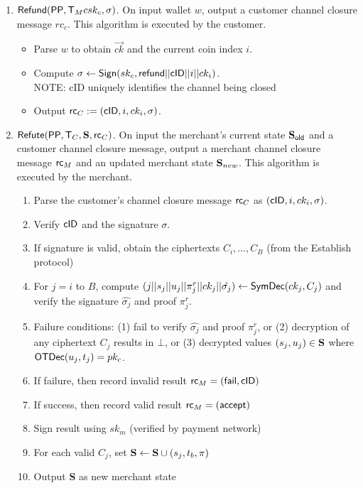 \documentclass[11pt]{report}
\begin{document}
\begin{enumerate}
\item ${\sf Refund}({\sf PP}, {\sf T}_{M} csk_c, \sigma)$. On input wallet $w$, output a customer channel closure message $rc_c$. This algorithm is executed by the customer.
\begin{itemize}
\item Parse $w$ to obtain $\vec{ck}$ and the current coin index $i$.
\item Compute $\sigma \leftarrow {\sf Sign}(sk_c, {\sf refund}||{\sf cID}||i||ck_i)$.
\\	NOTE: {\sf cID} uniquely identifies the channel being closed
\item Output ${\sf rc}_{C} := ({\sf cID}, i, ck_i, \sigma)$.
\end{itemize}

\item ${\sf Refute}({\sf PP}, {\sf T}_{C}, {\bf S}, {\sf rc}_{C})$. On input the merchant's current state ${\bf S}_{\sf old}$ and a customer channel closure message, output a merchant channel closure message ${\sf rc}_{M}$ and an updated merchant state ${\bf S}_{new}$. This algorithm is executed by the merchant.

\begin{enumerate}
\item Parse the customer's channel closure message ${\sf rc}_{C}$ as $({\sf cID}, i, ck_i, \sigma)$.
\item Verify ${\sf cID}$ and the signature $\sigma$.
\item If signature is valid, obtain the ciphertexts $C_i, \dots, C_{B}$ (from the {\sf Establish} protocol)
\item For $j = i$ to $B$, compute $(j||s_j||u_j || \pi_{j}^r || ck_j || \hat{\sigma_j}) \leftarrow {\sf SymDec}(ck_j, C_j)$ and verify the signature $\hat{\sigma_j}$ and proof ${\pi_j^r}$.
\item Failure conditions: (1) fail to verify $\hat{\sigma_j}$ and proof ${\pi_j^r}$, or (2) decryption of any ciphertext $C_j$ results in $\bot$, or (3) decrypted values $(s_j, u_j) \in {\bf S}$ where ${\sf OTDec}(u_j, t_j) = pk_c$.
\item If failure, then record invalid result ${\sf rc}_{M} = ({\sf fail}, {\sf cID})$
\item If success, then record valid result ${\sf rc}_{M} = ({\sf accept})$ 
\item Sign result using $sk_m$ (verified by payment network)
\item For each valid $C_j$, set ${\bf S} \leftarrow {\bf S} \cup (s_j, t_b, \pi)$ 
\item Output {\bf S} as new merchant state
\end{enumerate}


\end{enumerate}
\end{document}
